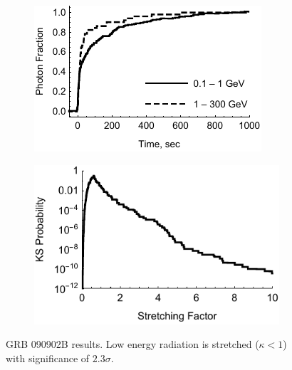 \documentclass[11pt,a4paper]{article}
\begin{document}
\begin{figure}
        \centering
        \begin{subfigure}{0.49\textwidth}
                \includegraphics[width=\textwidth]{lightCurve090902B}
                \label{fig:lightCurve090902B}
        \end{subfigure}
        \begin{subfigure}{0.49\textwidth}
                \includegraphics[width=\textwidth]{probabilities090902B}
                \label{fig:probabilities090902B}
        \end{subfigure}
        \caption{GRB 090902B results. Low energy radiation is stretched ($\kappa < 1$) with significance of $2.3\sigma$.}
        \label{fig:grb090902B}
\end{figure}
\end{document}
